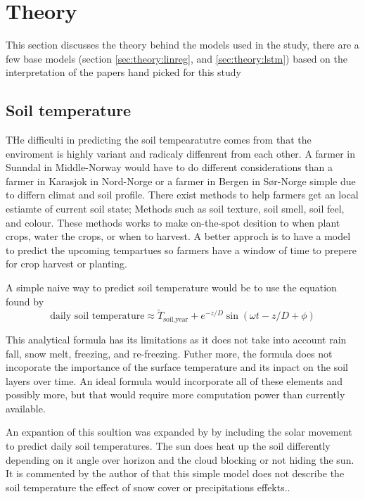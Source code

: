 \section{Theory}\label{sec:theory}

This section discusses the theory behind the models used in the study, there are a few base models (section \ref{sec:theory:linreg}, and \ref{sec:theory:lstm}) based on the interpretation of the papers hand picked for this study

\subsection{Soil temperature}

THe difficulti in predicting the soil tempearatutre comes from that the enviroment is highly variant and radicaly diffenrent from each other. A farmer in Sunndal in Middle-Norway would have to do different considerations than a farmer in Karasjok in Nord-Norge or a farmer in Bergen in Sør-Norge simple due to differn climat and soil profile. There exist methods to help farmers get an local estiamte of current soil state; Methods such as soil texture, soil smell, soil feel, and colour. These methods works to make on-the-spot desition to when plant crops, water the crops, or when to harvest. A better approch is to have a model to predict the upcoming tempartues so farmers have a window of time to prepere for crop harvest or planting.

A simple naive way to predict soil temperature would be to use the equation found by \cite{van_wijk_wr_periodic_1963}
\begin{equation}
	\text{daily soil temperature} \approx \widetilde{T}_{\text{soil,year}} + e^{-z/D}\sin(\omega t - z/D + \phi)
\end{equation}

This analytical formula has its limitations as it does not take into account rain fall, snow melt, freezing, and re-freezing. Futher more, the formula does not incoporate the importance of the surface temperature and its inpact on the soil layers over time. An ideal formula would incorporate all of these elements and possibly more, but that would require more computation power than currently available.

An expantion of this soultion was expanded by \cite{roodenburg_estimating_1985} by including the solar movement to predict daily soil temperatures. The sun does heat up the soil differently depending on it angle over horizon and the cloud blocking or not hiding the sun. It is commented by the author of \cite{roodenburg_estimating_1985} that this simple model does not describe the soil temperature the effect of snow cover or precipitations effekts..

